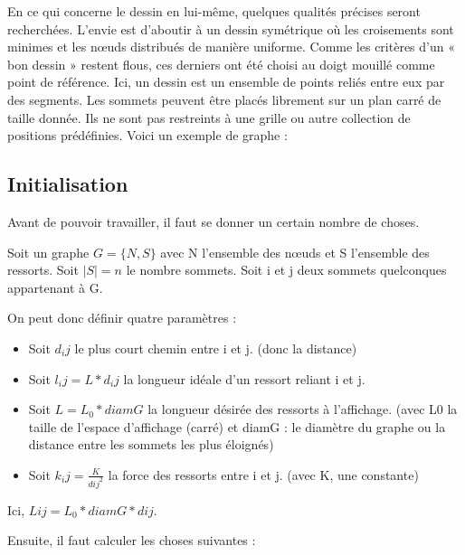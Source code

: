 \documentclass[a4paper,12pt]{article}
\begin{document}
En ce qui concerne le dessin en lui-même, quelques qualités précises seront recherchées. L’envie est d’aboutir à un dessin symétrique où les croisements sont minimes et les nœuds distribués de manière uniforme. Comme les critères d’un « bon dessin » restent flous, ces derniers ont été choisi au doigt mouillé comme point de référence. Ici, un dessin est un ensemble de points reliés entre eux par des segments. Les sommets peuvent être placés librement sur un plan carré de taille donnée. Ils ne sont pas restreints à une grille ou autre collection de positions prédéfinies. Voici un exemple de graphe :

\begin{center}
\end{center}

\subsection{Initialisation}

Avant de pouvoir travailler, il faut se donner un certain nombre de choses.

Soit un graphe $G = \{N, S\}$ avec N l’ensemble des nœuds et S l’ensemble des ressorts.
Soit $|S| = n$ le nombre sommets.
Soit i et j deux sommets quelconques appartenant à G.

On peut donc définir quatre paramètres :
\begin{itemize}
  \item Soit $d_ij$ le plus court chemin entre i et j. (donc la distance)
  \item Soit $l_ij = L * d_ij$ la longueur idéale d’un ressort reliant i et j.
  \item Soit $L = L_0 * diamG$ la longueur désirée des ressorts à l’affichage. (avec L0 la taille de l’espace d’affichage (carré) et diamG : le diamètre du graphe ou la distance entre les sommets les plus éloignés)
  \item Soit $k_ij = \frac{K}{dij^2}$ la force des ressorts entre i et j. (avec K, une constante)
\end{itemize}

Ici, $Lij = L_0 * diamG * dij$.

Ensuite, il faut calculer les choses suivantes :
\end{document}
